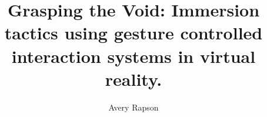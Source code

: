 \documentclass[10pt,palatino,code,picins,kaukecopyright,openright,woolshort,dropcaps,verbatim,index,euler]{woosterthesis}
\title{Grasping the Void: Immersion tactics using gesture controlled interaction systems in virtual reality.}
\author{Avery Rapson}
\begin{document}

\frontmatter
\maketitle
\ClearShipoutPicture
\disscopyright 

%                                                                                       
%                                                                                       


%                                                                                       
%                                                                                       



%                                                                                       
%                                                                                       

\end{document}
